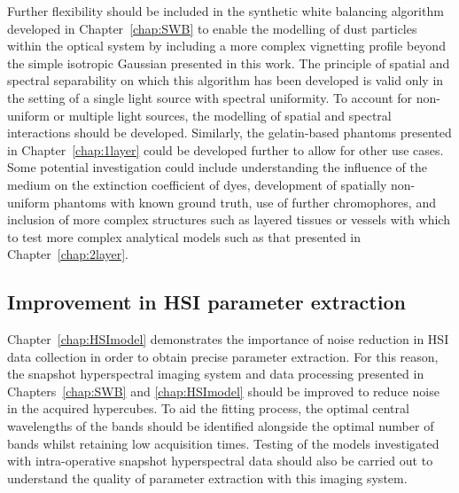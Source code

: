 Further flexibility should be included in the synthetic white balancing algorithm developed in Chapter~\ref{chap:SWB} to enable the modelling of dust particles within the optical system by including a more complex vignetting profile beyond the simple isotropic Gaussian presented in this work. The principle of spatial and spectral separability on which this algorithm has been developed is valid only in the setting of a single light source with spectral uniformity. To account for non-uniform or multiple light sources, the modelling of spatial and spectral interactions should be developed. Similarly, the gelatin-based phantoms presented in Chapter~\ref{chap:1layer} could be developed further to allow for other use cases. Some potential investigation could include understanding the influence of the medium on the extinction coefficient of dyes, development of spatially non-uniform phantoms with known ground truth, use of further chromophores, and inclusion of more complex structures such as layered tissues or vessels with which to test more complex analytical models such as that presented in Chapter~\ref{chap:2layer}. 

\subsection{Improvement in HSI parameter extraction}
Chapter~\ref{chap:HSImodel} demonstrates the importance of noise reduction in HSI data collection in order to obtain precise parameter extraction. For this reason, the snapshot hyperspectral imaging system and data processing presented in Chapters~\ref{chap:SWB} and \ref{chap:HSImodel} should be improved to reduce noise in the acquired hypercubes. To aid the fitting process, the optimal central wavelengths of the bands should be identified alongside the optimal number of bands whilst retaining low acquisition times. Testing of the models investigated with intra-operative snapshot hyperspectral data should also be carried out to understand the quality of parameter extraction with this imaging system. 

